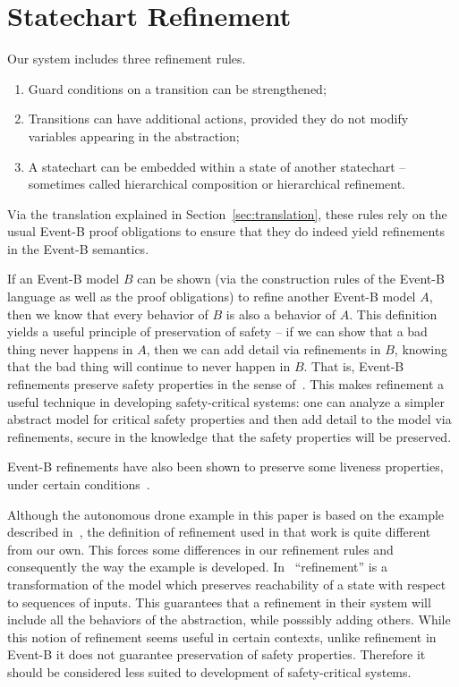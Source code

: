
\section{Statechart Refinement}
\label{sec:scref}

Our system includes three refinement rules.

\begin{enumerate}
\item Guard conditions on a transition can be strengthened;
\item Transitions can have additional actions, provided they do not
  modify variables appearing in the abstraction;
\item A statechart can be embedded within a state of another
  statechart -- sometimes called hierarchical composition or
  hierarchical refinement.
\end{enumerate}

Via the translation explained in Section~\ref{sec:translation}, these rules
rely on the usual Event-B proof obligations to ensure that they do
indeed yield refinements in the Event-B semantics.

If an Event-B model $B$ can be shown (via the construction rules of
the Event-B language as well as the proof obligations) to refine
another Event-B model $A$, then we know that every behavior of $B$ is
also a behavior of $A$. This definition yields a useful principle of
preservation of safety -- if we can show that a bad thing never
happens in $A$, then we can add detail via refinements in $B$, knowing
that the bad thing will continue to never happen in $B$. That is,
Event-B refinements preserve safety properties in the sense
of~\cite{lamport1977proving}. This makes refinement a useful technique
in developing safety-critical systems: one can analyze a simpler
abstract model for critical safety properties and then add detail to
the model via refinements, secure in the knowledge that the safety
properties will be preserved.

Event-B refinements have also been shown to preserve some liveness
properties, under certain conditions~\cite{hoang2016ltl}.

Although the autonomous drone example in this paper is based on the
example described in~\cite{Syriani_2019}, the definition of refinement
used in that work is quite different from our own. This forces some
differences in our refinement rules and consequently the way the
example is developed. In~\cite{Syriani_2019} ``refinement'' is a
transformation of the model which preserves reachability of a state
with respect to sequences of inputs. This guarantees that a refinement
in their system will include all the behaviors of the abstraction,
while posssibly adding others. While this notion of refinement seems
useful in certain contexts, unlike refinement in Event-B it does not
guarantee preservation of safety properties. Therefore it should be
considered less suited to development of safety-critical systems.

